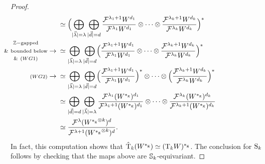 \documentclass[\MainFolder/Text.tex]{subfiles}
\begin{document}
\begin{proof}
\begin{align*}
&\simeq\Bigl( \bigoplus_{\Abs{\vec{\lambda}}=\lambda} \bigoplus_{\Abs{\vec{d}} = d} \frac{\Filtr^{\lambda_1 + 1} W^{d_1}}{\Filtr^{\lambda_1} W^{d_1}} \otimes \dotsb \otimes \frac{\Filtr^{\lambda_k + 1} W^{d_k}}{\Filtr^{\lambda_k} W^{d_k}}\Bigr)^* \\
&\mathclap{\substack{\Z-\text{gapped}  \\[1ex] \&\ \text{bounded below}  \\[1ex] \&\ (WG1)}\rightarrow\rule{7.7em}{0pt}}\simeq  \bigoplus_{\Abs{\vec{\lambda}}= \lambda} \bigoplus_{\Abs{\vec{d}} = d} \Bigl( \frac{\Filtr^{\lambda_1 + 1} W^{d_1}}{\Filtr^{\lambda_1} W^{d_1}} \otimes \dotsb \otimes \frac{\Filtr^{\lambda_k + 1} W^{d_k}}{\Filtr^{\lambda_k} W^{d_k}}\Bigr)^* \\
&\mathclap{{\scriptstyle (WG2)}\rightarrow\rule{4em}{0pt}}\simeq  \bigoplus_{\Abs{\vec{\lambda}}= \lambda} \bigoplus_{\Abs{\vec{d}} = d}  \Bigl( \frac{\Filtr^{\lambda_1 + 1} W^{d_1}}{\Filtr^{\lambda_1} W^{d_1}}\Bigr)^* \otimes \dotsb \otimes \Bigl( \frac{\Filtr^{\lambda_k + 1} W^{d_k}}{\Filtr^{\lambda_k} W^{d_k}}\Bigr)^* \\
&\simeq \bigoplus_{\Abs{\vec{d}} = d} \bigoplus_{\Abs{\vec{\lambda}}=\lambda} \frac{\Filtr^{\lambda_1}(W^{\GD})^{d_1}}{\Filtr^{\lambda_1 + 1}(W^{\GD})^{d_1}}\otimes \dotsb \otimes \frac{\Filtr^{\lambda_k}(W^{\GD})^{d_k}}{\Filtr^{\lambda_k + 1}(W^{\GD})^{d_k}} \\
&\simeq \frac{\Filtr^{\lambda} ({W^{\GD}}^{\otimes k})^d}{\Filtr^{\lambda + 1} ({W^{\GD}}^{\otimes k})^d}.
\end{align*}
In fact, this computation shows that $\hat{\mathrm{T}}_k(W^{*_{\mathrm{g}}}) \simeq (\mathrm{T}_k W)^{*_{\mathrm{g}}}$. The conclusion for $\mathrm{S}_k$ follows by checking that the maps above are $\mathbb{S}_k$-equivariant.
%

\end{proof}
\end{document}
